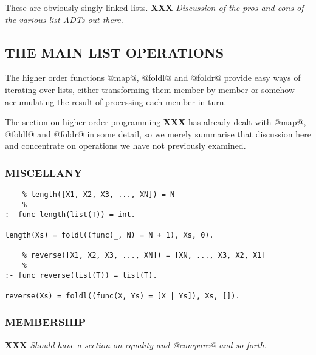\documentclass[a4paper,11pt,notitlepage,onecolumn]{article}
\newcommand{\XXX}[1]%
{{\small\textbf{XXX} \emph{#1}}}
\begin{document}
These are obviously singly linked lists.  \XXX{Discussion of the pros
and cons of the various list ADTs out there.}

\subsection{THE MAIN LIST OPERATIONS}

The higher order functions @map@, @foldl@ and @foldr@ provide easy ways
of iterating over lists, either transforming them member by member or
somehow accumulating the result of processing each member in turn.

The section on higher order programming \XXX{} has already dealt with
@map@, @foldl@ and @foldr@ in some detail, so we merely summarise that
discussion here and concentrate on operations we have not previously
examined.

\subsubsection{MISCELLANY}

\begin{verbatim}
    % length([X1, X2, X3, ..., XN]) = N
    %
:- func length(list(T)) = int.

length(Xs) = foldl((func(_, N) = N + 1), Xs, 0).

    % reverse([X1, X2, X3, ..., XN]) = [XN, ..., X3, X2, X1]
    %
:- func reverse(list(T)) = list(T).

reverse(Xs) = foldl((func(X, Ys) = [X | Ys]), Xs, []).
\end{verbatim}

\subsubsection{MEMBERSHIP}

\XXX{Should have a section on equality and @compare@ and so forth.}
\end{document}
